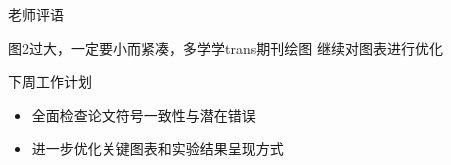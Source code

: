 \documentclass{beamer}
\begin{document}
\begin{frame}{老师评语}
  \begin{alertblock}{图2过大，一定要小而紧凑，多学学trans期刊绘图}
    继续对图表进行优化
  \end{alertblock}

  \vfill

  \begin{block}{下周工作计划}
    \begin{itemize}
      \item 全面检查论文符号一致性与潜在错误
      \item 进一步优化关键图表和实验结果呈现方式
    \end{itemize}
  \end{block}
\end{frame}

%   
%   
\end{document}
